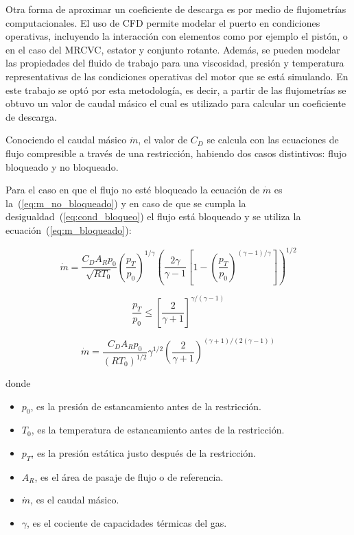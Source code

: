 Otra forma de aproximar un coeficiente de descarga es por medio de flujometrías
computacionales.
%
El uso de CFD permite modelar el puerto en condiciones operativas, incluyendo
la interacción con elementos como por ejemplo el pistón, o en el caso del
MRCVC, estator y conjunto rotante.
%
Además, se pueden modelar las propiedades del fluido de trabajo para una
viscosidad, presión y temperatura representativas de las condiciones operativas
del motor que se está simulando.
%
En este trabajo se optó por esta metodología, es decir, a partir de las flujometrías se
obtuvo un valor de caudal másico el cual es utilizado para calcular un
coeficiente de descarga.

Conociendo el caudal másico $\dot{m}$, el valor de $C_{D}$  se calcula con las
ecuaciones de flujo compresible a través de una restricción, habiendo dos casos
distintivos: flujo bloqueado y no bloqueado.

Para el caso en que el flujo no esté bloqueado la ecuación de $\dot{m}$ es
la~(\ref{eq:m_no_bloqueado}) y en caso de que se cumpla la
desigualdad~(\ref{eq:cond_bloqueo}) el flujo está bloqueado y se utiliza la
ecuación~(\ref{eq:m_bloqueado}):
%

\begin{equation}\label{eq:m_no_bloqueado}
    \dot{m} = \frac{C_D A_R p_0}{\sqrt{R T_0}} {\left(\frac{p_T}{p_0} \right)}^{1/\gamma} {\left( \frac{2\gamma}{\gamma-1} \left[1- {(\frac{p_T}{p_0})}^{{(\gamma-1)}/\gamma} \right] \right)}^{1/2}
\end{equation}

\begin{equation}\label{eq:cond_bloqueo}
  \frac{p_T}{p_0} \le {[\frac{2}{\gamma+1}]}^{\gamma/(\gamma - 1)}
\end{equation}

\begin{equation}\label{eq:m_bloqueado}
  \dot{m}=  \frac {C_D A_R p_0} {{(R T_0)}^{1/2}} \gamma^{1/2} {\left( \frac{2}{\gamma+1} \right)}^{(\gamma+1)/(2(\gamma-1))}
\end{equation}

donde
\begin{itemize}
    \item $p_0$, es la presión de estancamiento antes de la restricción.
    \item $T_0$, es la temperatura de estancamiento antes de la restricción.
    \item $p_T$, es la presión estática justo después de la restricción.
    \item $A_R$, es el área de pasaje de flujo o de referencia.
    \item $\dot{m}$, es el caudal másico.
  \item $\gamma$, es el cociente de capacidades térmicas del gas.
\end{itemize}

